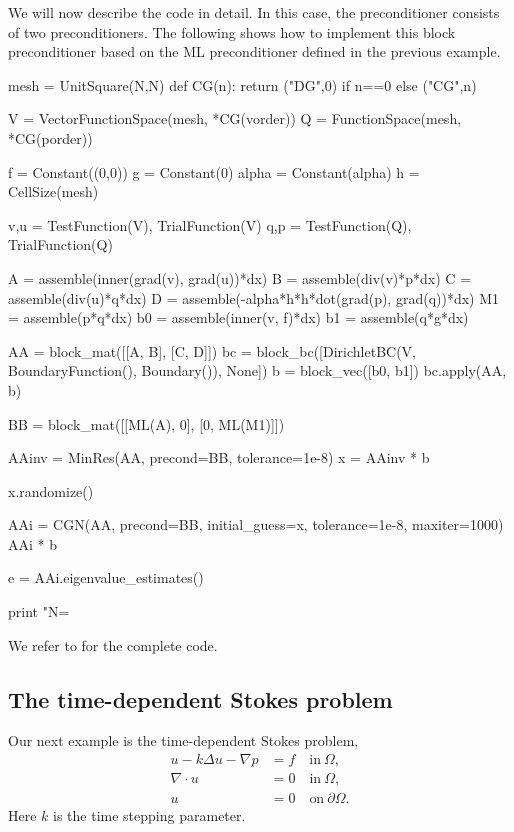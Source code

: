 We will now describe the code in detail.  In this case, the
preconditioner consists of two preconditioners.  The following shows
how to implement this block preconditioner
based on the ML preconditioner defined in the previous example.
\begin{python}
mesh = UnitSquare(N,N)
def CG(n):
    return ("DG",0) if n==0 else ("CG",n)

V = VectorFunctionSpace(mesh, *CG(vorder))
Q = FunctionSpace(mesh, *CG(porder))

f = Constant((0,0))
g = Constant(0)
alpha = Constant(alpha)
h = CellSize(mesh)

v,u = TestFunction(V), TrialFunction(V)
q,p = TestFunction(Q), TrialFunction(Q)

A  = assemble(inner(grad(v), grad(u))*dx)
B  = assemble(div(v)*p*dx)
C  = assemble(div(u)*q*dx)
D  = assemble(-alpha*h*h*dot(grad(p), grad(q))*dx)
M1 = assemble(p*q*dx)
b0 = assemble(inner(v, f)*dx)
b1 = assemble(q*g*dx)

AA = block_mat([[A, B],
                [C, D]])
bc = block_bc([DirichletBC(V, BoundaryFunction(), Boundary()), None])
b = block_vec([b0, b1])
bc.apply(AA, b)

BB = block_mat([[ML(A),  0],
                [0, ML(M1)]])


AAinv = MinRes(AA, precond=BB, tolerance=1e-8)
x = AAinv * b

x.randomize()

AAi = CGN(AA, precond=BB, initial_guess=x, tolerance=1e-8, maxiter=1000)
AAi * b

e = AAi.eigenvalue_estimates()

print "N=%
\end{python}
We refer to  for the complete code.

\subsection{The time-dependent Stokes problem}
Our next example is the time-dependent Stokes problem,
\begin{align}
u - k \Delta u - \nabla p &= f \quad \mbox{in} \ \Omega, \\
\nabla \cdot u &= 0 \quad \mbox{in} \  \Omega, \\
             u &= 0   \quad \mbox{on} \  \partial \Omega.
\end{align}
Here $k$ is the time stepping parameter.

